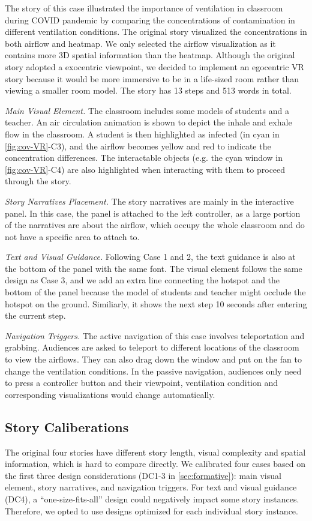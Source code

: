 The story of this case illustrated the importance of ventilation in classroom during COVID pandemic by comparing the concentrations of contamination in different ventilation conditions. The original story visualized the concentrations in both airflow and heatmap. We only selected the airflow visualization as it contains more 3D spatial information than the heatmap. Although the original story adopted a exocentric viewpoint, we decided to implement an egocentric VR story because it would be more immersive to be in a life-sized room rather than viewing a smaller room model. {The story has 13 steps and 513 words in total.}

\textit{Main Visual Element.} The classroom includes some models of students and a teacher. An air circulation animation is shown to depict the inhale and exhale flow in the classroom. A student is then highlighted as infected (in cyan in \autoref{fig:cov-VR}-C3), and the airflow becomes yellow and red to indicate the concentration differences. The interactable objects (e.g. the cyan window in \autoref{fig:cov-VR}-C4) are also highlighted when interacting with them to proceed through the story.

\textit{Story Narratives Placement.} The story narratives are mainly in the interactive panel. In this case, the panel is attached to the left controller, as a large portion of the narratives are about the airflow, which occupy the whole classroom and do not have a specific area to attach to.

\textit{Text and Visual Guidance.} Following Case 1 and 2, the text guidance is also at the bottom of the panel with the same font. The visual element follows the same design as Case 3, and we add an extra line connecting the hotspot and the bottom of the panel because the model of students and teacher might occlude the hotspot on the ground. Similiarly, it shows the next step 10 seconds after entering the current step.

\textit{Navigation Triggers.} The active navigation of this case involves teleportation and grabbing. Audiences are asked to teleport to different locations of the classroom to view the airflows. They can also drag down the window and put on the fan to change the ventilation conditions. In the passive navigation, audiences only need to press a controller button and their viewpoint, ventilation condition and corresponding visualizations would change automatically.


{\subsection{Story Caliberations}}
\label{sec:calibration}
{The original four stories have different story length, visual complexity and spatial information, which is hard to compare directly. We calibrated four cases based on the first three design considerations (DC1-3 in \autoref{sec:formative}): main visual element, story narratives, and navigation triggers. For text and visual guidance (DC4), a ``one-size-fits-all'' design could negatively impact some story instances. Therefore, we opted to use designs optimized for each individual story instance.}

